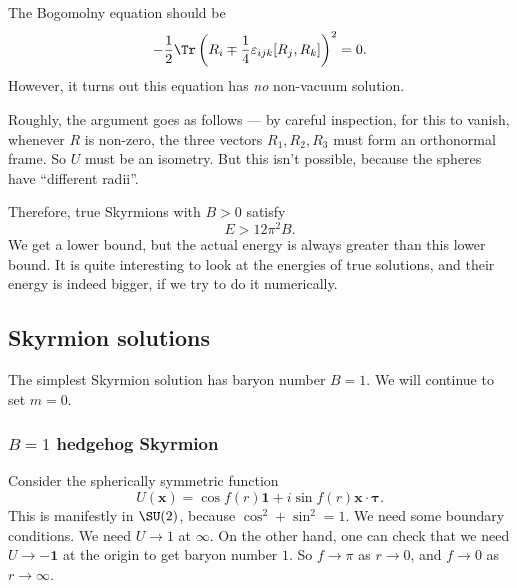 \documentclass[a4paper]{article}
\begin{document}
The Bogomolny equation should be
\[
  - \frac{1}{2} \Tr\left(R_i \mp \frac{1}{4} \varepsilon_{ijk} [R_j, R_k]\right)^2 = 0.
\]
However, it turns out this equation has \emph{no} non-vacuum solution.

Roughly, the argument goes as follows --- by careful inspection, for this to vanish, whenever $R$ is non-zero, the three vectors $R_1, R_2, R_3$ must form an orthonormal frame. So $U$ must be an isometry. But this isn't possible, because the spheres have ``different radii''.

Therefore, true Skyrmions with $B > 0$ satisfy
\[
  E > 12 \pi^2 B.
\]
We get a lower bound, but the actual energy is always greater than this lower bound. It is quite interesting to look at the energies of true solutions, and their energy is indeed bigger, if we try to do it numerically.

\subsection{Skyrmion solutions}
The simplest Skyrmion solution has baryon number $B = 1$. We will continue to set $m = 0$.
\subsubsection*{$B = 1$ hedgehog Skyrmion}
Consider the spherically symmetric function
\[
  U(\mathbf{x}) = \cos f(r) \mathbf{1} + i \sin f(r) \mathbf{x} \cdot \boldsymbol\tau.
\]
This is manifestly in $\SU(2)$, because $\cos^2 + \sin^2 = 1$. We need some boundary  conditions. We need $U \to 1$ at $\infty$. On the other hand, one can check that we need $U \to -\mathbf{1}$ at the origin to get baryon number $1$. So $f \to \pi$ as $r \to 0$, and $f \to 0$ as $r \to \infty$.




\printindex
\end{document}
